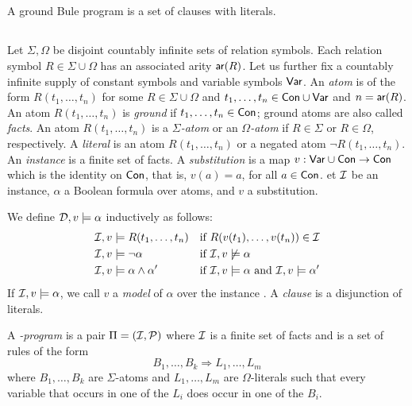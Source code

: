 \documentclass[conference]{IEEEtran}
\begin{document}
\subsection{\bflat}

A ground Bule program is a set of clauses with literals. 

\subsection{\bcore}

Let $\Sigma,\Omega$ be disjoint countably infinite sets of relation symbols.  
Each relation symbol $R\in \Sigma\cup\Omega$ has an associated arity $\mathsf{ar}(R)$.  
Let us further fix a countably infinite supply of constant symbols  and variable symbols $\mathsf{Var}$.  
An \emph{atom} is of the form $R(t_1,\ldots,t_n)$ for some $R\in \Sigma\cup\Omega$ and $t_1,\ldots,t_n\in\mathsf{Con}\cup\mathsf{Var}$ and $n=\mathsf{ar}(R)$. 
An atom $R(t_1,\ldots,t_n)$ is \emph{ground} if $t_1,\ldots,t_n\in\mathsf{Con}$; ground atoms are also called \emph{facts}. 
An atom $R(t_1,\ldots,t_n)$ is a \emph{$\Sigma$-atom} or an \emph{$\Omega$-atom} if $R\in \Sigma$ or $R\in \Omega$, respectively. 
A \emph{literal} is an atom $R(t_1,\ldots,t_n)$ or a negated atom $\neg R(t_1,\ldots,t_n)$. 
An \emph{instance} is a finite set of facts. A \emph{substitution} is a map $v:\mathsf{Var}\cup\mathsf{Con}\to\mathsf{Con}$ which is the identity on $\mathsf{Con}$, that is, $v(a)=a$, for all $a\in\mathsf{Con}$.
et $\mathcal{I}$ be an instance, $\alpha$ a Boolean formula over atoms, and $v$ a substitution. 

We define $\mathcal{D},v\models \alpha$ inductively as follows: 
%
\begin{align*}
  \mathcal{I},v & \models R(t_1,\ldots,t_n) && \text{if
  $R(v(t_1),\ldots,v(t_n))\in \mathcal{I}$} \\
  \mathcal{I}, v& \models \neg \alpha && \text{if $\mathcal{I},v\not\models \alpha$}
  \\
  \mathcal{I}, v& \models \alpha \wedge \alpha' && \text{if $\mathcal{I},v\models
  \alpha$ and $\mathcal{I},v\models\alpha'$}
\end{align*}
%
If $\mathcal{I},v\models\alpha$, we call $v$ a \emph{model} of $\alpha$ over the instance \Imc. 
A \emph{clause} is a disjunction of literals.

A \emph{\bcore-program} is a pair $\Pi=(\mathcal{I},\mathcal{P})$ where $\mathcal{I}$ is a finite set of facts and \Pmc is a set of rules of the form 
%
\[B_1, \ldots, B_k \Rightarrow L_1, \ldots, L_m\]
%
where $B_1,\ldots,B_k$ are $\Sigma$-atoms and $L_1,\ldots,L_m$ are $\Omega$-literals such that every variable that occurs in one of the $L_i$ does occur in one of the $B_i$.
\end{document}
